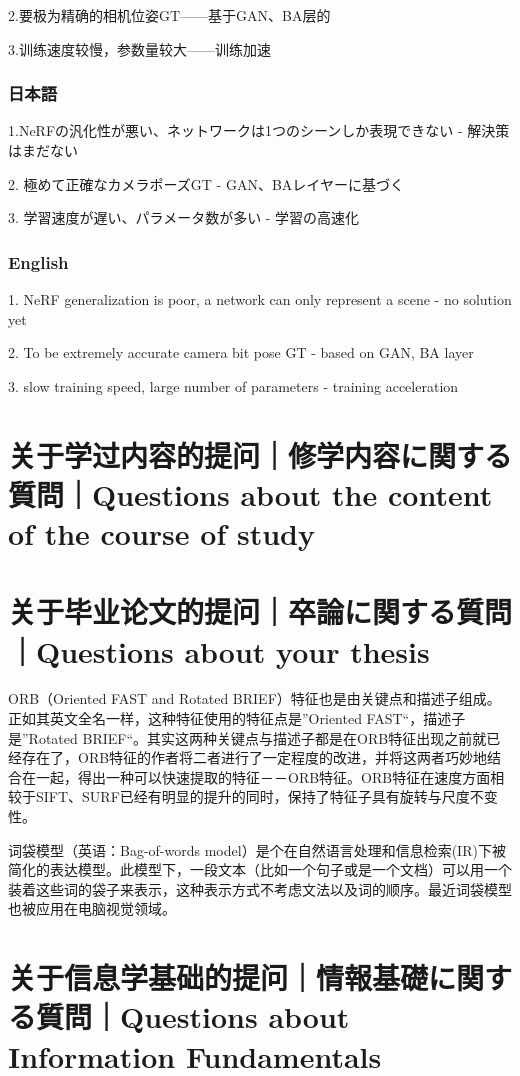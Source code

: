 \documentclass[lang=cn,11pt,a4paper]{elegantpaper}
\begin{document}
2.要极为精确的相机位姿GT——基于GAN、BA层的

3.训练速度较慢，参数量较大——训练加速
\subsubsection{日本語}
1.NeRFの汎化性が悪い、ネットワークは1つのシーンしか表現できない - 解決策はまだない

2. 極めて正確なカメラポーズGT - GAN、BAレイヤーに基づく

3. 学習速度が遅い、パラメータ数が多い - 学習の高速化
\subsubsection{English}
1. NeRF generalization is poor, a network can only represent a scene - no solution yet

2. To be extremely accurate camera bit pose GT - based on GAN, BA layer

3. slow training speed, large number of parameters - training acceleration

\section{关于学过内容的提问｜修学内容に関する質問｜Questions about the content of the course of study}


\section{关于毕业论文的提问｜卒論に関する質問｜Questions about your thesis}
ORB（Oriented FAST and Rotated BRIEF）特征也是由关键点和描述子组成。正如其英文全名一样，这种特征使用的特征点是”Oriented FAST“，描述子是”Rotated BRIEF“。其实这两种关键点与描述子都是在ORB特征出现之前就已经存在了，ORB特征的作者将二者进行了一定程度的改进，并将这两者巧妙地结合在一起，得出一种可以快速提取的特征－－ORB特征。ORB特征在速度方面相较于SIFT、SURF已经有明显的提升的同时，保持了特征子具有旋转与尺度不变性。

词袋模型（英语：Bag-of-words model）是个在自然语言处理和信息检索(IR)下被简化的表达模型。此模型下，一段文本（比如一个句子或是一个文档）可以用一个装着这些词的袋子来表示，这种表示方式不考虑文法以及词的顺序。最近词袋模型也被应用在电脑视觉领域。




\section{关于信息学基础的提问｜情報基礎に関する質問｜Questions about Information Fundamentals}
\end{document}

